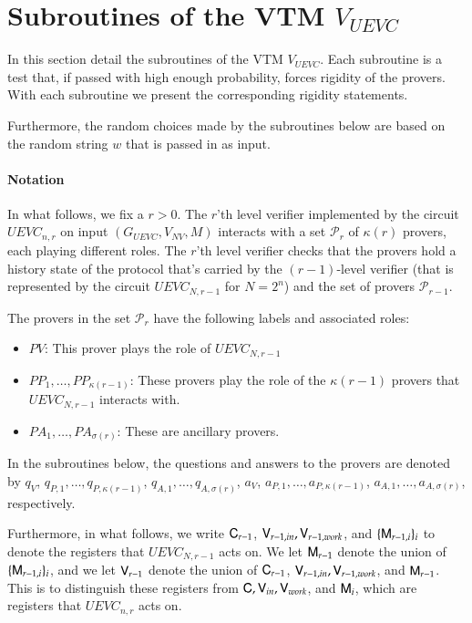 
\section{Subroutines of the VTM $V_{UEVC}$}

In this section detail the subroutines of the VTM $V_{UEVC}$. Each subroutine is a test that, if passed with high enough probability, forces rigidity of the provers. With each subroutine we present the corresponding rigidity statements.

Furthermore, the random choices made by the subroutines below are based on the random string $w$ that is passed in as input. 

\paragraph{Notation} In what follows, we fix a $r > 0$. The $r$'th level verifier implemented by the circuit $UEVC_{n,r}$ on input $(G_{UEVC},V_{NV},M)$ interacts with a set $\mathcal{P}_r$ of $\kappa(r)$ provers, each playing different roles. The $r$'th level verifier checks that the provers hold a history state of the protocol that's carried by the $(r-1)$-level verifier (that is represented by the circuit $UEVC_{N,r-1}$ for $N = 2^n$) and the set of provers $\mathcal{P}_{r-1}$. 

The provers in the set $\mathcal{P}_r$ have the following labels and associated roles:
\begin{itemize}
	\item $PV$: This prover plays the role of $UEVC_{N,r-1}$
	\item $PP_1,\ldots,PP_{\kappa(r-1)}$: These provers play the role of the $\kappa(r-1)$ provers that $UEVC_{N,r-1}$ interacts with.
	\item $PA_1,\ldots,PA_{\sigma(r)}$: These are ancillary provers.
\end{itemize}

In the subroutines below, the questions and answers to the provers are denoted by $q_V$, $q_{P,1},\ldots,q_{P,\kappa(r-1)}$, $q_{A,1},\ldots,q_{A,\sigma(r)}$, $a_V$, $a_{P,1},\ldots,a_{P,\kappa(r-1)}$, $a_{A,1},\ldots,a_{A,\sigma(r)}$, respectively.

Furthermore, in what follows, we write ${\mathsf{C}}_{r-1}$, ${\mathsf{V}}_{r-1,in},{\mathsf{V}}_{r-1,work}$, and $\{ {\mathsf{M}}_{r-1,i} \}_i$ to denote the registers that $UEVC_{N,r-1}$ acts on. We let ${\mathsf{M}}_{r-1}$ denote the union of $\{ {\mathsf{M}}_{r-1,i} \}_i$, and we let ${\mathsf{V}}_{r-1}$ denote the union of ${\mathsf{C}}_{r-1}$, ${\mathsf{V}}_{r-1,in},{\mathsf{V}}_{r-1,work}$, and ${\mathsf{M}}_{r-1}$. This is to distinguish these registers from ${\mathsf{C}},{\mathsf{V}}_{in},{\mathsf{V}}_{work}$, and ${\mathsf{M}}_i$, which are registers that $UEVC_{n,r}$ acts on.

